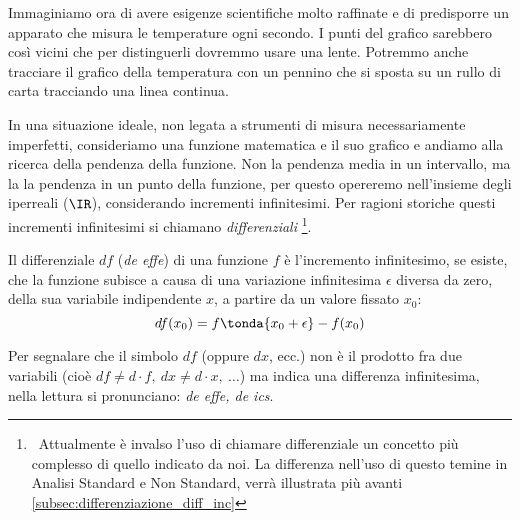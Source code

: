 Immaginiamo ora di avere esigenze scientifiche molto raffinate e di 
predisporre un apparato che misura le temperature ogni secondo. 
I punti del grafico sarebbero così vicini che per distinguerli dovremmo 
usare una lente.
Potremmo anche tracciare il grafico della temperatura con un pennino che si 
sposta su un rullo di carta tracciando una linea continua.


In una situazione ideale, non legata a strumenti di misura necessariamente 
imperfetti, consideriamo una funzione matematica e il suo grafico e andiamo 
alla ricerca della pendenza della funzione.
Non la pendenza media in un intervallo, ma la la pendenza in un 
punto della funzione, per questo opereremo nell'insieme degli 
iperreali (\(\IR\)), 
considerando incrementi infinitesimi. 
Per ragioni storiche questi incrementi infinitesimi si chiamano 
\emph{differenziali} \footnote{~Attualmente è invalso l'uso di chiamare 
differenziale un concetto più complesso di quello indicato da noi. 
La differenza nell'uso di questo temine in Analisi Standard e Non Standard, 
verrà illustrata più avanti \ref{subsec:differenziazione_diff_inc}}.
\begin{definizione}
Il differenziale 
\(df\) (\emph{de effe}) di una funzione \(f\) è 
l'incremento infinitesimo, se esiste, 
che la funzione subisce a causa di una variazione infinitesima 
\(\epsilon\) diversa da zero, della sua variabile indipendente \(x\), 
a partire da un valore fissato \(x_0\):
\[df(x_0) = f \tonda{x_0 + \epsilon} - f(x_0)\]
\end{definizione}

\begin{osservazione}
Per segnalare che il simbolo \(df\) (oppure \(dx\), ecc.) non è il prodotto 
fra due variabili 
(cioè \(df \ne d \cdot f,\ dx \ne d\cdot x,\ \dots\)) ma indica 
una differenza infinitesima, nella lettura si pronunciano:
\textit{de effe, de ics}.
\end{osservazione}

